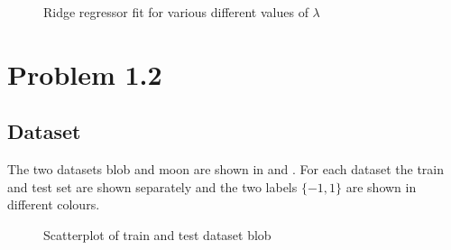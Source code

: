 \documentclass[12pt,a4paper]{scrartcl}
\begin{document}
\begin{figure}[H]
		\caption{Ridge regressor fit for various different values of $\lambda$}
		\label{fig:ex1_1_lambda}
	\end{figure}
	
	 \section*{Problem 1.2}
	 \subsection*{Dataset}
	 The two datasets blob and moon are shown in  and . For each dataset the train and test set are shown separately  and the two labels $\{-1, 1\}$ are shown in different colours.

	\begin{figure}[H]
		\centering	
		\caption{Scatterplot of train and test dataset blob}
		\label{fig:ex1_2_data_blob}
	\end{figure}
\end{document}
